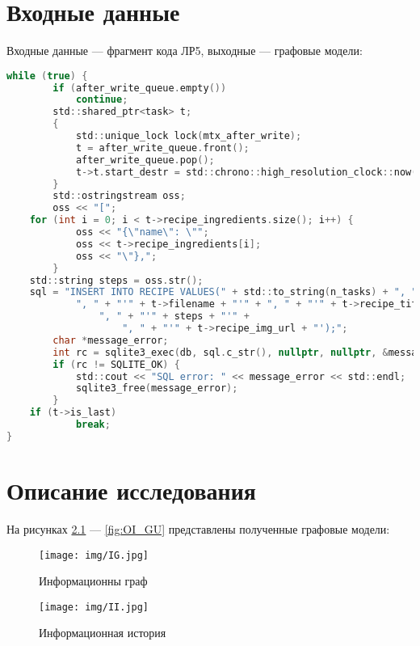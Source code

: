 \documentclass{bmstu}
\begin{document}
\chapter{Входные данные}
Входные данные --- фрагмент кода ЛР5, выходные --- графовые модели:
\begin{center}
\captionsetup{justification=raggedright,singlelinecheck=off}
\begin{lstlisting}[label=lst:listing, language=c, numbers=none, caption=Фрагмент кода]
while (true) {
        if (after_write_queue.empty())
            continue;
        std::shared_ptr<task> t;
        {
            std::unique_lock lock(mtx_after_write);
            t = after_write_queue.front();
            after_write_queue.pop();
            t->t.start_destr = std::chrono::high_resolution_clock::now();
        }
        std::ostringstream oss;
        oss << "[";
	for (int i = 0; i < t->recipe_ingredients.size(); i++) {
            oss << "{\"name\": \"";
            oss << t->recipe_ingredients[i];
            oss << "\"},";
        }
	std::string steps = oss.str();
	sql = "INSERT INTO RECIPE VALUES(" + std::to_string(n_tasks) + ", " + std::to_string(t->issue_id) +
            ", " + "'" + t->filename + "'" + ", " + "'" + t->recipe_title + "'" +
                ", " + "'" + steps + "'" +
                    ", " + "'" + t->recipe_img_url + "');";
        char *message_error;
        int rc = sqlite3_exec(db, sql.c_str(), nullptr, nullptr, &message_error);
        if (rc != SQLITE_OK) {
            std::cout << "SQL error: " << message_error << std::endl;
            sqlite3_free(message_error);
        }
	if (t->is_last)
            break;
}
\end{lstlisting}
\end{center}

\chapter{Описание исследования}
На рисунках \ref{fig:IG} --- \ref{fig:OI_GU} представлены полученные графовые модели:

\begin{figure}[h]
	\centering
        \vspace{0pt}
	\texttt{[image: img/IG.jpg]}
	\caption{Информационны граф}
 \vspace*{3in}
	\label{fig:IG}
\end{figure}

\begin{figure}[h]
	\centering
        \vspace{0pt}
	\texttt{[image: img/II.jpg]}
	\caption{Информационная история}
 \vspace*{3in}
	\label{fig:II}
\end{figure}
\end{document}
